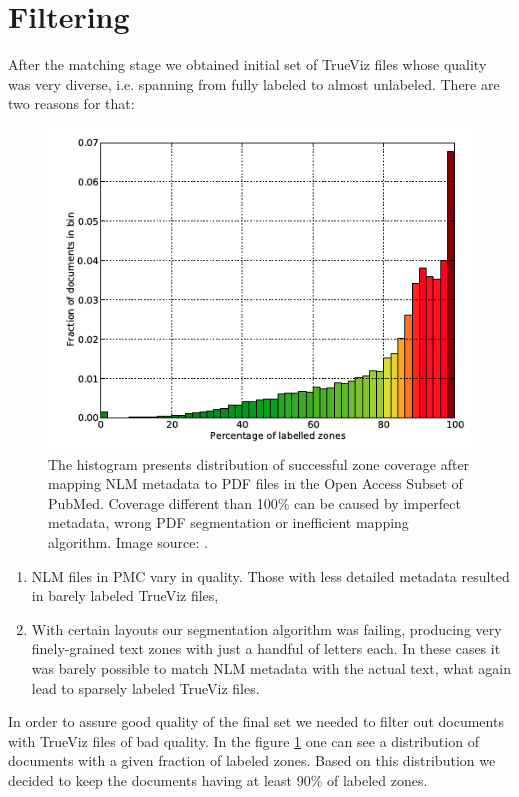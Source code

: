 \section{Filtering}
After the matching stage we obtained initial set of TrueViz files whose quality was very diverse, i.e. spanning from fully labeled to almost unlabeled. There are two reasons for that:
\begin{figure}[ht!]
  \centering
  \includegraphics[width=12cm]{plots/zone_coverage_grotoap2}
  \caption{The histogram presents distribution of successful zone coverage after mapping NLM metadata to PDF files in the Open Access Subset of PubMed. Coverage different than 100\% can be caused by imperfect metadata, wrong PDF segmentation or inefficient mapping algorithm. Image source: \cite{DominikaTkaczykPaweSzostek2014}.}
  \label{fig:trueviz_match_histogram}
\end{figure}
\begin{enumerate}
\item NLM files in PMC vary in quality. Those with less detailed metadata resulted in barely labeled TrueViz files,
\item With certain layouts our segmentation algorithm was failing, producing very finely-grained text zones with just a handful of letters each. In these cases it was barely possible to match NLM metadata with the actual text, what again lead to sparsely labeled TrueViz files. 
\end{enumerate}
In order to assure good quality of the final set we needed to filter out documents with TrueViz files of bad quality. In the figure \ref{fig:trueviz_match_histogram} one can see a distribution of documents with a given fraction of labeled zones.
Based on this distribution we decided to keep the documents having at least 90\% of labeled zones.

